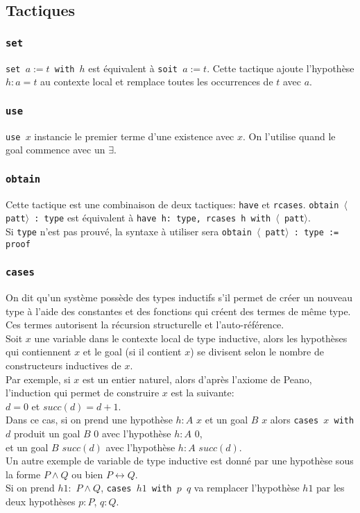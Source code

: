    \subsection{Tactiques}
    \subsubsection{\texttt{set}}
    \texttt{set $a := t$ with $h$} est équivalent à \texttt{soit $a := t$}. Cette tactique ajoute l'hypothèse $h : a = t$ au contexte local et remplace toutes les occurrences de $t$ avec $a$.
    \subsubsection{\texttt{use}}
    \texttt{use $x$} instancie le premier terme d'une existence avec $x$. On l'utilise quand le goal commence avec un $\exists$. 
    \subsubsection{\texttt{obtain}}
    Cette tactique est une combinaison de deux tactiques: \texttt{have} et \texttt{rcases}.
    \texttt{obtain $\langle$ patt$\rangle$ : type} est équivalent à \texttt{have h: type, rcases h with $\langle$ patt$\rangle$}. \\ Si \texttt{type} n'est pas prouvé, la syntaxe à utiliser sera \texttt{obtain $\langle$ patt$\rangle$ : type := proof}
    \subsubsection{\texttt{cases}}
    On dit qu'un système possède des types inductifs s'il permet de créer un nouveau type à l'aide des constantes et des fonctions qui créent des termes de même type. Ces termes autorisent la récursion structurelle et l'auto-référence. \\
    Soit $x$ une variable dans le contexte local de type inductive, alors les hypothèses qui contiennent $x$ et le goal (si il contient $x$) se divisent selon le nombre de constructeurs inductives de $x$.\\ Par exemple, si $x$ est un entier naturel, alors d'après l'axiome de Peano, l'induction qui permet de construire $x$ est la suivante:\\ $d=0$ et $succ(d)=d+1$. \\ Dans ce cas, si on prend une hypothèse $h:A$ $x$ et un goal $B$ $x$ alors \texttt{cases $x$ with $d$} produit un goal $B$ $0$ avec l'hypothèse $h:A$ $0$, \\et un goal $B$ $succ(d)$ avec l'hypothèse $h:A$ $succ(d)$. \\
    Un autre exemple de variable de type inductive est donné par une hypothèse sous la forme $P\wedge Q$ ou bien $P\leftrightarrow Q$.\\ Si on prend $h1:$ $P\wedge Q$, \texttt{cases $h1$ with $p$ $q$} va remplacer l'hypothèse $h1$ par les deux hypothèses $p:P$, $q:Q$.
